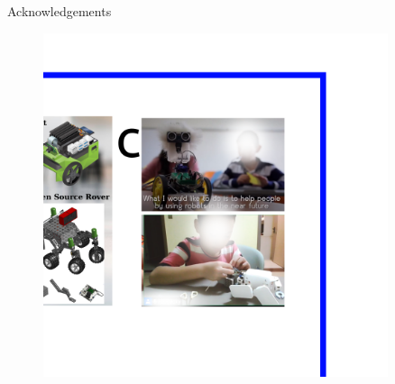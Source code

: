 {
\begin{frame}{Acknowledgements}


      \begin{figure}
        \centering
        \includegraphics[width=0.9\textwidth]{./figures/future-work/versions/drawing-v00.png}
      \end{figure}


\end{frame}
}

